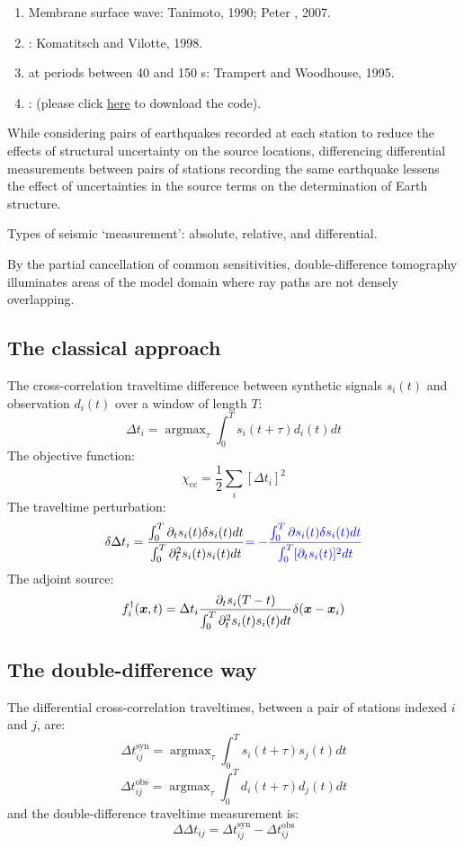 \begin{enumerate}[\hspace{10mm}*]
  \item Membrane surface wave: Tanimoto, 1990; Peter \etal, 2007.
  \item {}
    :
    Komatitsch and Vilotte, 1998.
  \item {} at periods between 40 and 150 s:
    Trampert and Woodhouse, 1995.
  \item {}
    :
     (please click \href{https://github.com/yanhuay/seisDD}{here}
    to download the code).
\end{enumerate}

While considering pairs of earthquakes recorded at each station to reduce
the effects of structural uncertainty on the source locations,
differencing differential measurements between pairs of stations recording
the same earthquake lessens the effect of uncertainties in the source terms
on the determination of Earth structure.

Types of seismic `measurement': absolute, relative, and differential.

By the partial cancellation of common sensitivities, double-difference
tomography illuminates areas of the model domain where ray paths are not
densely overlapping.

\subsection{The classical approach}
The cross-correlation traveltime difference between synthetic signals $s_i(t)$
and observation $d_i(t)$ over a window of length $T$:
\[ \Delta t_i = \mathop{\arg\max}_\tau \int_0^T s_i(t + \tau) d_i(t) dt \]
The objective function:
\[ \chi_\text{cc} = \frac{1}{2} \sum_i [\Delta t_i]^2 \]
The traveltime perturbation:
\[ \delta \Delta t_i = \frac{ \int_0^T \partial_t s_i(t) \delta s_i(t) dt }
  { \int_0^T \partial_t^2 s_i(t) s_i(t) dt }
  {\color{blue} = - \frac{ \int_0^T \partial s_i(t) \delta s_i(t) dt }
  { \int_0^T [ \partial_t s_i(t) ]^2 dt } } \]
The adjoint source:
\[ f_i^\dagger(\boldsymbol{x}, t) = \Delta t_i \frac{ \partial_t s_i(T - t) }
  { \int_0^T \partial_t^2 s_i(t) s_i(t) dt } \delta(\boldsymbol{x} - \boldsymbol{x}_i) \]

\subsection{The double-difference way}
The differential cross-correlation traveltimes, between a pair of stations
indexed $i$ and $j$, are:
\[ \Delta t_{ij}^\text{syn} = \mathop{\arg\max}_\tau
  \int_0^T s_i(t + \tau) s_j(t) dt \]
\[ \Delta t_{ij}^\text{obs} = \mathop{\arg\max}_\tau
  \int_0^T d_i(t + \tau) d_j(t) dt \]
and the double-difference traveltime measurement is:
\[ \Delta\Delta t_{ij} = \Delta t_{ij}^\text{syn} - \Delta t_{ij}^\text{obs} \]

